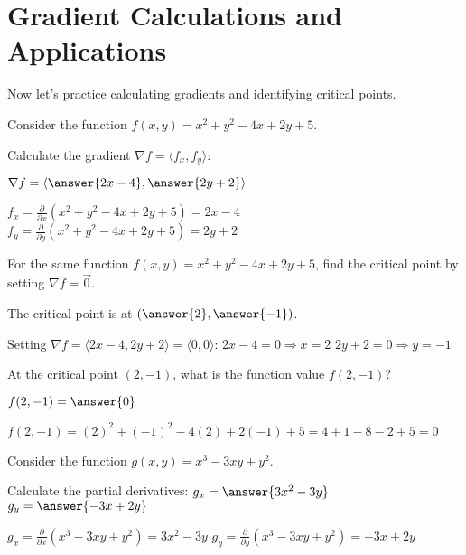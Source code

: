 \documentclass{ximera}
\begin{document}
\section{Gradient Calculations and Applications}

Now let's practice calculating gradients and identifying critical points.

\begin{exercise}
Consider the function $f(x,y) = x^2 + y^2 - 4x + 2y + 5$.

Calculate the gradient $\nabla f = \langle f_x, f_y \rangle$:

$\nabla f = \langle \answer{2x-4}, \answer{2y+2} \rangle$

\begin{feedback}
$f_x = \frac{\partial}{\partial x}(x^2 + y^2 - 4x + 2y + 5) = 2x - 4$
$f_y = \frac{\partial}{\partial y}(x^2 + y^2 - 4x + 2y + 5) = 2y + 2$
\end{feedback}
\end{exercise}

\begin{exercise}
For the same function $f(x,y) = x^2 + y^2 - 4x + 2y + 5$, find the critical point by setting $\nabla f = \vec{0}$.

The critical point is at $(\answer{2}, \answer{-1})$.

\begin{feedback}
Setting $\nabla f = \langle 2x-4, 2y+2 \rangle = \langle 0, 0 \rangle$:
$2x - 4 = 0 \Rightarrow x = 2$
$2y + 2 = 0 \Rightarrow y = -1$
\end{feedback}
\end{exercise}

\begin{exercise}
At the critical point $(2, -1)$, what is the function value $f(2, -1)$?

$f(2, -1) = \answer{0}$

\begin{feedback}
$f(2, -1) = (2)^2 + (-1)^2 - 4(2) + 2(-1) + 5 = 4 + 1 - 8 - 2 + 5 = 0$
\end{feedback}
\end{exercise}

\begin{exercise}
Consider the function $g(x,y) = x^3 - 3xy + y^2$. 

Calculate the partial derivatives:
$g_x = \answer{3x^2 - 3y}$
$g_y = \answer{-3x + 2y}$

\begin{feedback}
$g_x = \frac{\partial}{\partial x}(x^3 - 3xy + y^2) = 3x^2 - 3y$
$g_y = \frac{\partial}{\partial y}(x^3 - 3xy + y^2) = -3x + 2y$
\end{feedback}
\end{exercise}
\end{document}
